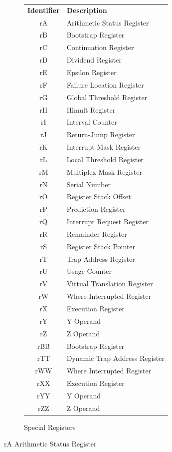 \documentclass[a4paper,11pt]{report}
\newcommand{\head}[1]{\textbf{#1}}
\begin{document}
\begin{figure}[ht!]
\begin{center}
\begin{tabular}{ c l }
\head{Identifier} & \head{Description}\\
rA & Arithmetic Status Register\\
rB & Bootstrap Register\\
rC & Continuation Register\\
rD & Dividend Register\\
rE & Epsilon Register\\
rF & Failure Location Register\\
rG & Global Threshold Register\\
rH & Himult Register\\
rI & Interval Counter\\
rJ & Return-Jump Register\\
rK & Interrupt Mask Register\\
rL & Local Threshold Register\\
rM & Multiplex Mask Register\\
rN & Serial Number\\
rO & Register Stack Offset\\
rP & Prediction Register\\
rQ & Interrupt Request Register\\
rR & Remainder Register\\
rS & Register Stack Pointer\\
rT & Trap Address Register\\
rU & Usage Counter\\
rV & Virtual Translation Register\\
rW & Where Interrupted Register\\
rX & Execution Register\\
rY & Y Operand\\
rZ & Z Operand\\
rBB & Bootstrap Register\\
rTT & Dynamic Trap Address Register\\
rWW & Where Interrupted Register\\
rXX & Execution Register\\
rYY & Y Operand\\
rZZ & Z Operand\\
\end{tabular}
\end{center}
\caption{Special Registers}
\label{fig:spec_regs}
\end{figure}
rA Arithmetic Status Register
\end{document}
